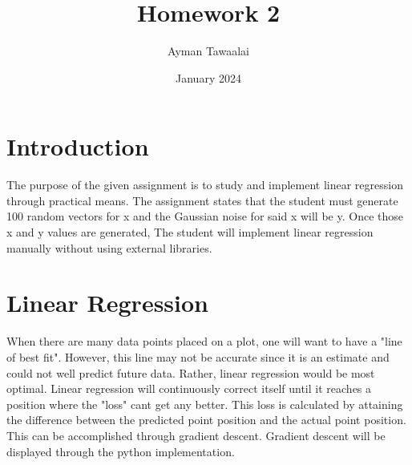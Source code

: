 \documentclass{article}
\title{Homework 2}
\author{Ayman Tawaalai}
\date{January 2024}
\begin{document}
\maketitle

\section{Introduction}
The purpose of the given assignment is to study and implement linear regression through practical means. The assignment states that the student must generate 100 random vectors for x and the Gaussian noise for said x will be y. Once those x and y values are generated, The student will implement linear regression manually without using external libraries. 

\section{Linear Regression}
When there are many data points placed on a plot, one will want to have a "line of best fit". However, this line may not be accurate since it is an estimate and could not well predict future data. Rather, linear regression would be most optimal. Linear regression will continuously correct itself until it reaches a position where the "loss" cant get any better. This loss is calculated by attaining the difference between the predicted point position and the actual point position. This can be accomplished through gradient descent. Gradient descent will be displayed through the python implementation.
\end{document}
